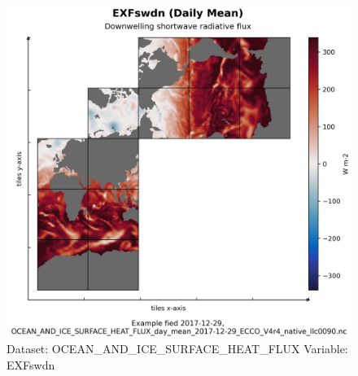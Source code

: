 \begin{figure}[H]
\centering
\includegraphics[width=\textwidth]{../images/plots/native_plots/Ocean_and_Sea-Ice_Surface_Heat_Fluxes/EXFswdn.png}
\caption{Dataset: OCEAN\_AND\_ICE\_SURFACE\_HEAT\_FLUX Variable: EXFswdn}
\label{tab:table-OCEAN_AND_ICE_SURFACE_HEAT_FLUX_EXFswdn-Plot}
\end{figure}
\pagebreak
